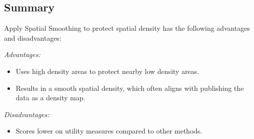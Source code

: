 \subsection{Summary}

Apply Spatial Smoothing to protect spatial density has the following advantages and disadvantages:

\noindent\emph{Advantages:}
\begin{itemize}
    \item Uses high density areas to protect nearby low density areas.
    \item Results in a smooth spatial density, which often aligns with publishing the data as a density map.
\end{itemize}

\noindent\emph{Disadvantages:}
\begin{itemize}
    \item Scores lower on utility measures compared to other methods.
\end{itemize}
    
\newpage